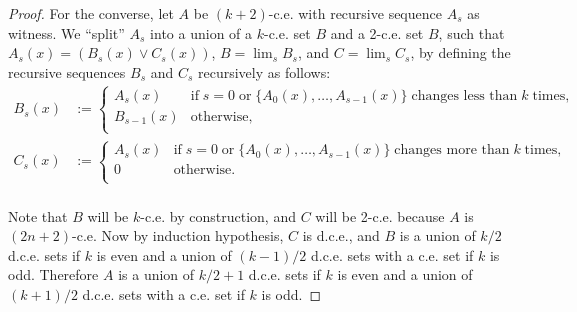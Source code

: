 \documentclass{article}
\begin{document}
\begin{enumerate}[label={\bf Q\arabic*:}]
\begin{proof}
      For the converse, let $A$ be $(k+2)$-c.e. with recursive sequence
      $A_s$ as witness. We ``split'' $A_s$ into a union of a $k$-c.e.
      set $B$ and a 2-c.e. set $B$, such that $A_s(x)=(B_s(x)\vee C_s(x))$,
      $B=\lim_sB_s$, and $C=\lim_sC_s$, by defining the recursive sequences
      $B_s$ and $C_s$ recursively as follows:
      \begin{align*}
        B_s(x) &:=
        \begin{cases}
          A_s(x) &\text{if}\; s=0\; \text{or}\;
            \{A_0(x),\ldots,A_{s-1}(x)\}\; \text{changes less than}\; k\;
            \text{times},\\
          B_{s-1}(x) &\text{otherwise},\\
        \end{cases}\\
        C_s(x) &:=
        \begin{cases}
          A_s(x) &\text{if}\; s=0\; \text{or}\;
            \{A_0(x),\ldots,A_{s-1}(x)\}\; \text{changes more than}\; k\;
            \text{times},\\
          0 &\text{otherwise}.\\
        \end{cases}\\
      \end{align*}

      Note that $B$ will be $k$-c.e. by construction, and $C$ will be
      2-c.e. because $A$ is $(2n+2)$-c.e. Now by induction hypothesis, $C$
      is d.c.e., and $B$ is a union of $k/2$ d.c.e. sets if $k$ is even and
      a union of $(k-1)/2$ d.c.e. sets with a c.e. set if $k$ is odd.
      Therefore $A$ is a union of $k/2+1$ d.c.e. sets if $k$ is even and
      a union of $(k+1)/2$ d.c.e. sets with a c.e. set if $k$ is odd.
    \end{proof}
\end{enumerate}
\end{document}
